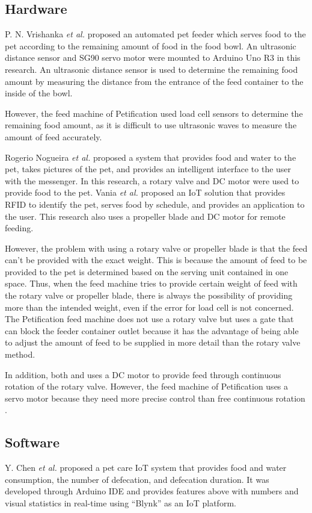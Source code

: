 \documentclass[conference]{IEEEtran}
\begin{document}
\subsection{Hardware}
P. N. Vrishanka \textit{et al.} \cite{b10} proposed an automated pet feeder which serves food to the pet according to the remaining amount of food in the food bowl. An ultrasonic distance sensor and SG90 servo motor were mounted to Arduino Uno R3 in this research. An ultrasonic distance sensor is used to determine the remaining food amount by measuring the distance from the entrance of the feed container to the inside of the bowl.

However, the feed machine of Petification used load cell sensors to determine the remaining food amount, as it is difficult to use ultrasonic waves to measure the amount of feed accurately.

Rogerio Nogueira \textit{et al.} \cite{b11} proposed a system that provides food and water to the pet, takes pictures of the pet, and provides an intelligent interface to the user with the messenger. In this research, a rotary valve and DC motor were used to provide food to the pet. Vania \textit{et al.} \cite{b12} proposed an IoT solution that provides RFID to identify the pet, serves food by schedule, and provides an application to the user. This research also uses a propeller blade and DC motor for remote feeding.

However, the problem with using a rotary valve or propeller blade is that the feed can’t be provided with the exact weight. This is because the amount of feed to be provided to the pet is determined based on the serving unit contained in one space. Thus, when the feed machine tries to provide certain weight of feed with the rotary valve or propeller blade, there is always the possibility of providing more than the intended weight, even if the error for load cell is not concerned. The Petification feed machine does not use a rotary valve but uses a gate that can block the feeder container outlet because it has the advantage of being able to adjust the amount of feed to be supplied in more detail than the rotary valve method.

In addition, both \cite{b11} and \cite{b12} uses a DC motor to provide feed through continuous rotation of the rotary valve. However, the feed machine of Petification uses a servo motor because they need more precise control than free continuous rotation \cite{b13}.

\subsection{Software}
Y. Chen \textit{et al.} \cite{b5} proposed a pet care IoT system that provides food and water consumption, the number of defecation, and defecation duration. It was developed through Arduino IDE and provides features above with numbers and visual statistics in real-time using “Blynk” as an IoT platform.
\end{document}
